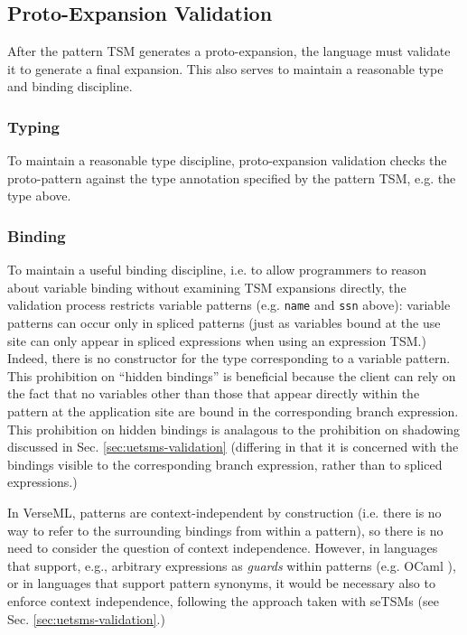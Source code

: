 {{{\subsection{Proto-Expansion Validation}\label{sec:ptsms-validation}
After the pattern TSM generates a proto-expansion, the language must validate it to generate a final expansion. This also serves to maintain a reasonable type and binding discipline.

\subsubsection{Typing}
To maintain a reasonable type discipline, proto-expansion validation  checks the  proto-pattern against the type annotation specified by the pattern TSM, e.g. the type  above.

\subsubsection{Binding}\label{sec:ptsms-hygiene}
To maintain a useful binding discipline, i.e. to allow programmers to reason about variable binding without examining TSM expansions directly, the validation process restricts variable patterns (e.g. \lstinline{name} and \lstinline{ssn} above): variable patterns can occur only in spliced patterns (just as variables bound at the use site can only appear in spliced expressions when using an expression TSM.) Indeed, there is no constructor for the type  corresponding to a variable pattern. This prohibition on ``hidden bindings'' is beneficial because the client can rely on the fact that no variables other than those that appear directly within the pattern at the application site are bound in the corresponding branch expression. This prohibition on hidden bindings is analagous to the prohibition on shadowing discussed in Sec. \ref{sec:uetsms-validation} (differing in that it is concerned with the bindings visible to the corresponding branch expression, rather than to spliced expressions.)

In VerseML, patterns are context-independent by construction (i.e. there is no way to refer to the surrounding bindings from within a pattern), so there is no need to consider the question of context independence. However, in languages that support, e.g., arbitrary expressions as \emph{guards} within patterns (e.g. OCaml \cite{ocaml-manual}), or in languages that support pattern synonyms, it would be necessary also to enforce context independence, following the approach taken with seTSMs (see Sec. \ref{sec:uetsms-validation}.) 

}}}
